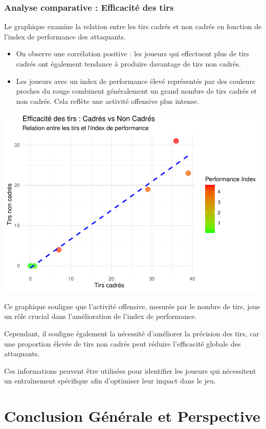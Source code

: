 \documentclass[
  6pt,
]{article}
\begin{document}
\subsubsection{Analyse comparative : Efficacité des
tirs}\label{analyse-comparative-efficacituxe9-des-tirs}

Le graphique examine la relation entre les tirs cadrés et non cadrés en
fonction de l'index de performance des attaquants.

\begin{itemize}
\item
  On observe une corrélation positive : les joueurs qui effectuent plus
  de tirs cadrés ont également tendance à produire davantage de tirs non
  cadrés.
\item
  Les joueurs avec un index de performance élevé représentés par des
  couleurs proches du rouge combinent généralement un grand nombre de
  tirs cadrés et non cadrés. Cela reflète une activité offensive plus
  intense.
\end{itemize}

\includegraphics[width=0.8\linewidth]{Analyse_Impact_Performances_Joueurs_files/figure-latex/Cadrés vs Non Cadrés-forwards-1}

Ce graphique souligne que l'activité offensive, mesurée par le nombre de
tirs, joue un rôle crucial dans l'amélioration de l'index de
performance.

Cependant, il souligne également la nécessité d'améliorer la précision
des tirs, car une proportion élevée de tirs non cadrés peut réduire
l'efficacité globale des attaquants.

Ces informations peuvent être utilisées pour identifier les joueurs qui
nécessitent un entraînement spécifique afin d'optimiser leur impact dans
le jeu.

\section{Conclusion Générale et
Perspective}\label{conclusion-guxe9nuxe9rale-et-perspective}
\end{document}
